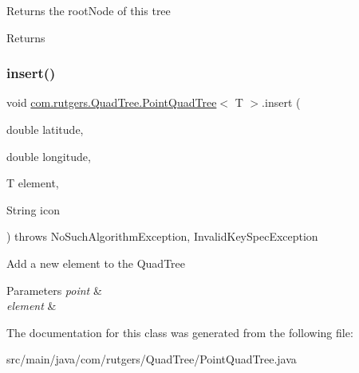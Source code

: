 Returns the root\+Node of this tree

\begin{DoxyReturn}{Returns}

\end{DoxyReturn}
\mbox{\label{classcom_1_1rutgers_1_1QuadTree_1_1PointQuadTree_af18b98ffc4fa1a7c2e803db8c8f59392}} 
\subsubsection{\texorpdfstring{insert()}{insert()}}
{\footnotesize\ttfamily void \hyperlink{classcom_1_1rutgers_1_1QuadTree_1_1PointQuadTree}{com.\+rutgers.\+Quad\+Tree.\+Point\+Quad\+Tree}$<$ T $>$.insert (\begin{DoxyParamCaption}\item[{double}]{latitude,  }\item[{double}]{longitude,  }\item[{T}]{element,  }\item[{String}]{icon }\end{DoxyParamCaption}) throws No\+Such\+Algorithm\+Exception, Invalid\+Key\+Spec\+Exception}

Add a new element to the Quad\+Tree


\begin{DoxyParams}{Parameters}
{\em point} & \\
\hline
{\em element} & \\
\hline
\end{DoxyParams}


The documentation for this class was generated from the following file\+:\begin{DoxyCompactItemize}
\item 
src/main/java/com/rutgers/\+Quad\+Tree/Point\+Quad\+Tree.\+java\end{DoxyCompactItemize}
